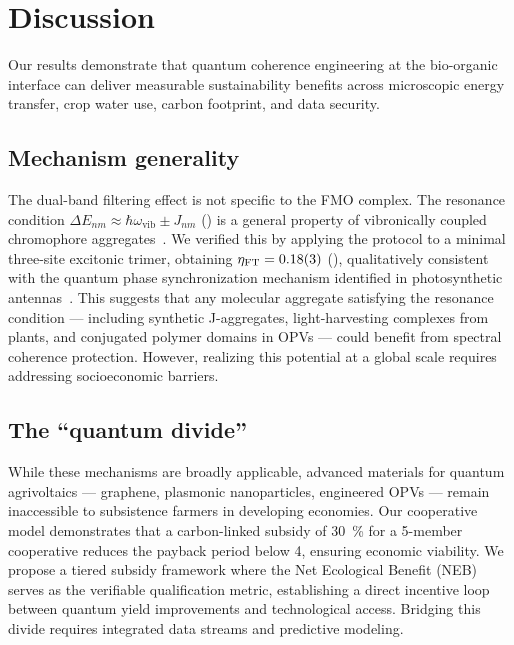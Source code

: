 \documentclass[12pt]{iopart}
\begin{document}

\section{Discussion}

Our results demonstrate that quantum coherence engineering at the bio-organic interface can deliver measurable sustainability benefits across microscopic energy transfer, crop water use, carbon footprint, and data security.

\subsection{Mechanism generality}

The dual-band filtering effect is not specific to the FMO complex.
The resonance condition $\Delta E_{nm} \approx \hbar\omega_{\mathrm{vib}} \pm J_{nm}$ () is a general property of vibronically coupled chromophore aggregates~\cite{Chin2013}.
We verified this by applying the protocol to a minimal three-site excitonic trimer, obtaining $\eta_{\mathrm{FT}} = \num{0.18 \pm 0.03}$ (), qualitatively consistent with the quantum phase synchronization mechanism identified in photosynthetic antennas~\cite{Zhu2024}.
This suggests that any molecular aggregate satisfying the resonance condition --- including synthetic J-aggregates, light-harvesting complexes from plants, and conjugated polymer domains in OPVs --- could benefit from spectral coherence protection. However, realizing this potential at a global scale requires addressing socioeconomic barriers.

\subsection{The ``quantum divide''}

While these mechanisms are broadly applicable, advanced materials for quantum agrivoltaics --- graphene, plasmonic nanoparticles, engineered OPVs --- remain inaccessible to subsistence farmers in developing economies.
Our cooperative model demonstrates that a carbon-linked subsidy of \qty{30}{\percent} for a 5-member cooperative reduces the payback period below \qty{4}{\yr}, ensuring economic viability.
We propose a tiered subsidy framework where the Net Ecological Benefit (NEB) serves as the verifiable qualification metric, establishing a direct incentive loop between quantum yield improvements and technological access. Bridging this divide requires integrated data streams and predictive modeling.
\end{document}
